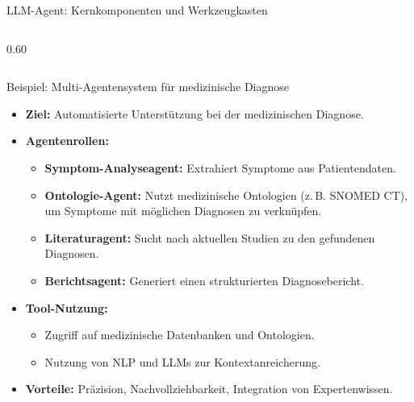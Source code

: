 \documentclass[aspectratio=1610, xcolor=dvipsnames, 9pt]{beamer}
\begin{document}
\begin{frame}{LLM-Agent: Kernkomponenten und Werkzeugkasten}
\begin{columns}
\begin{column}{0.60\textwidth}
    \end{column}
  \end{columns}
\end{frame}

\begin{frame}{Beispiel: Multi-Agentensystem für medizinische Diagnose}
  \begin{itemize}
    \item \textbf{Ziel:} Automatisierte Unterstützung bei der medizinischen Diagnose.
    \item \textbf{Agentenrollen:}
      \begin{itemize}
        \item \textbf{Symptom-Analyseagent:} Extrahiert Symptome aus Patientendaten.
        \item \textbf{Ontologie-Agent:} Nutzt medizinische Ontologien (z. B. SNOMED CT), um Symptome mit möglichen Diagnosen zu verknüpfen.
        \item \textbf{Literaturagent:} Sucht nach aktuellen Studien zu den gefundenen Diagnosen.
        \item \textbf{Berichtsagent:} Generiert einen strukturierten Diagnosebericht.
      \end{itemize}
    \item \textbf{Tool-Nutzung:}
      \begin{itemize}
        \item Zugriff auf medizinische Datenbanken und Ontologien.
        \item Nutzung von NLP und LLMs zur Kontextanreicherung.
      \end{itemize}
    \item \textbf{Vorteile:} Präzision, Nachvollziehbarkeit, Integration von Expertenwissen.
  \end{itemize}
\end{frame}
\end{document}
